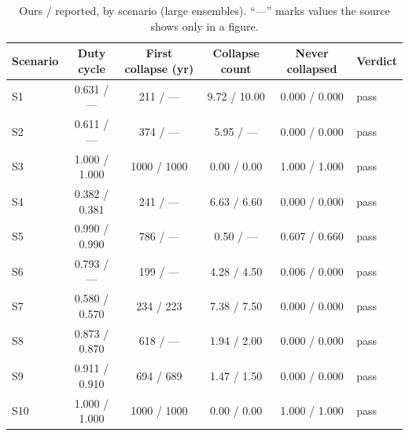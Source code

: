 \documentclass[11pt]{article}
\newcommand{\pass}{\textcolor{green!55!black}{pass}}
\begin{document}
\begin{table}[ht]
\centering
\caption{Ours / reported, by scenario (large ensembles). ``---'' marks values the
source shows only in a figure.}
\small
\begin{tabular}{lccccl}
\toprule
Scenario & Duty cycle & First collapse (yr) & Collapse count & Never collapsed & Verdict \\
\midrule
S1 & 0.631 / --- & 211 / --- & 9.72 / 10.00 & 0.000 / 0.000 & \pass \\
S2 & 0.611 / --- & 374 / --- & 5.95 / --- & 0.000 / 0.000 & \pass \\
S3 & 1.000 / 1.000 & 1000 / 1000 & 0.00 / 0.00 & 1.000 / 1.000 & \pass \\
S4 & 0.382 / 0.381 & 241 / --- & 6.63 / 6.60 & 0.000 / 0.000 & \pass \\
S5 & 0.990 / 0.990 & 786 / --- & 0.50 / --- & 0.607 / 0.660 & \pass \\
S6 & 0.793 / --- & 199 / --- & 4.28 / 4.50 & 0.006 / 0.000 & \pass \\
S7 & 0.580 / 0.570 & 234 / 223 & 7.38 / 7.50 & 0.000 / 0.000 & \pass \\
S8 & 0.873 / 0.870 & 618 / --- & 1.94 / 2.00 & 0.000 / 0.000 & \pass \\
S9 & 0.911 / 0.910 & 694 / 689 & 1.47 / 1.50 & 0.000 / 0.000 & \pass \\
S10 & 1.000 / 1.000 & 1000 / 1000 & 0.00 / 0.00 & 1.000 / 1.000 & \pass \\
\bottomrule
\end{tabular}
\label{tab:replication-wide}
\end{table}
\end{document}
